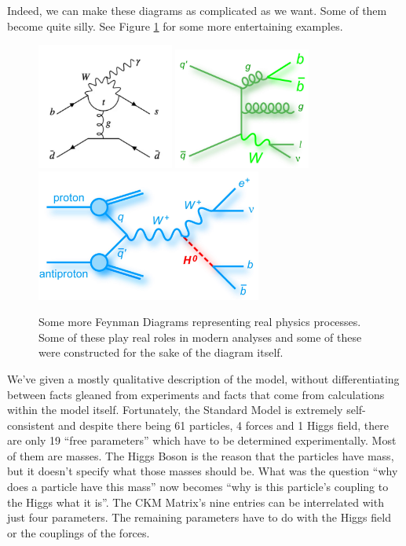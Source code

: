 Indeed, we can make these diagrams as complicated as we want. Some of them become quite silly. See Figure \ref{Fig:Intro:Diags} for some more entertaining examples.\begin{figure}[h]
    \centering
        \includegraphics[width=0.4\textwidth]{F1/goof3}
        \includegraphics[width=0.4\textwidth]{F1/goof2}
        \includegraphics[width=0.66\textwidth]{F1/goof1}
        \caption{Some more Feynman Diagrams representing real physics processes. Some of these play real roles in modern analyses and some of these were constructed for the sake of the diagram itself.}
        \label{Fig:Intro:Diags}
\end{figure}

We've given a mostly qualitative description of the model, without differentiating between facts gleaned from experiments and facts that come from calculations within the model itself. Fortunately, the Standard Model is extremely self-consistent and despite there being 61 particles, 4 forces and 1 Higgs field, there are only 19 ``free parameters'' which have to be determined experimentally. Most of them are masses. The Higgs Boson is the reason that the particles have mass, but it doesn't specify what those masses should be. What was the question ``why does a particle have this mass'' now becomes ``why is this particle's coupling to the Higgs what it is''. The CKM Matrix's nine entries can be interrelated with just four parameters. The remaining parameters have to do with the Higgs field or the couplings of the forces.

